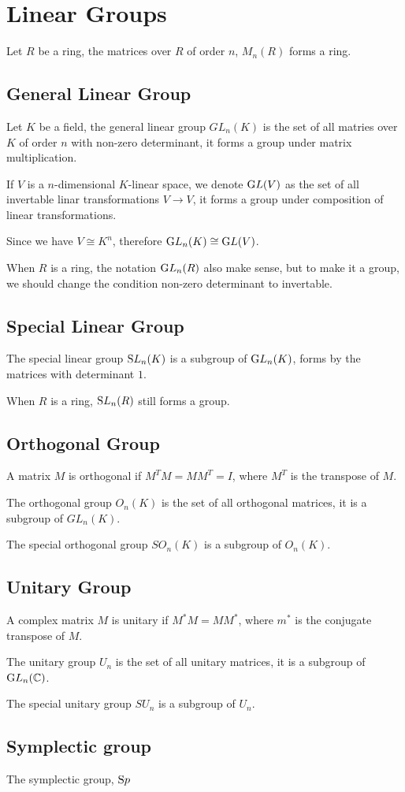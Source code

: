 
\section{Linear Groups}
Let $R$ be a ring, the matrices over $R$ of order $n$, $M_n(R)$ forms a ring.

\subsection{General Linear Group}
Let $K$ be a field, the general linear group $GL_n(K)$ is the set of all
matries over $K$ of order $n$ with non-zero determinant, it forms a group under matrix multiplication.

If $V$ is a $n$-dimensional $K$-linear space, we denote $\mathop{\mathrm GL}(V)$ as the set of all
invertable linar transformations $V \to V$, it forms a group under composition of 
linear transformations.

Since we have $V \cong K^n$, therefore $\mathop{\mathrm GL}_n(K) \cong \mathop{\mathrm GL}(V)$.

When $R$ is a ring, the notation $\mathop{\mathrm GL}_n(R)$ also make sense, but to make it a group, 
we should change the condition non-zero determinant to invertable.

\subsection{Special Linear Group}
The special linear group $\mathop{\mathrm SL}_n(K)$ is a subgroup of $\mathop{\mathrm GL}_n(K)$, forms by the matrices
with determinant $1$.

When $R$ is a ring, $\mathop{\mathrm SL}_n(R)$ still forms a group.

\subsection{Orthogonal Group}
A matrix $M$ is orthogonal if $M^T M = M M^T = I$, where $M^T$ is the transpose of $M$.

The orthogonal group $O_n(K)$ is the set of all orthogonal matrices, it is a subgroup of $GL_n(K)$.

The special orthogonal group $SO_n(K)$ is a subgroup of $O_n(K)$.

\subsection{Unitary Group}
A complex matrix $M$ is unitary if $M^\ast M = M M^\ast$, where $m^\ast$ is the conjugate transpose of $M$.

The unitary group $U_n$ is the set of all unitary matrices, it is a subgroup of $\mathop{\mathrm GL}_n(\mathbb C)$.

The special unitary group $SU_n$ is a subgroup of $U_n$.

\subsection{Symplectic group}
The symplectic group, $\mathop{\mathrm Sp}$
